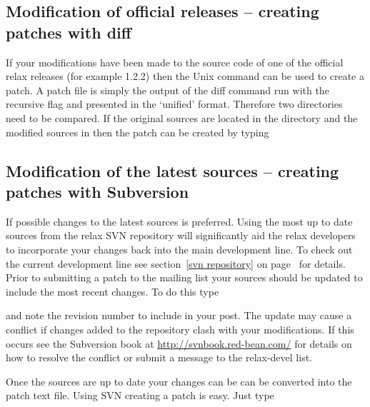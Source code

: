 \subsection{Modification of official releases -- creating patches with diff}

If your modifications have been made to the source code of one of the official relax releases (for example 1.2.2) then the Unix command  can be used to create a patch.  A patch file is simply the output of the diff command run with the recursive flag and presented in the `unified' format.  Therefore two directories need to be compared.  If the original sources are located in the directory  and the modified sources in  then the patch can be created by typing




\subsection{Modification of the latest sources -- creating patches with Subversion}

If possible changes to the latest sources is preferred.  Using the most up to date sources from the relax SVN repository will significantly aid the relax developers to incorporate your changes back into the main development line.  To check out the current development line see section~\ref{svn repository} on page~\pageref{svn repository} for details.  Prior to submitting a patch to the mailing list your sources should be updated to include the most recent changes.  To do this type


and note the revision number to include in your post.  The update may cause a conflict if changes added to the repository clash with your modifications.  If this occurs see the Subversion book at \href{http://svnbook.red-bean.com/}{http://svnbook.red-bean.com/} for details on how to resolve the conflict or submit a message to the rela\mbox{x-d}evel list.

Once the sources are up to date your changes can be can be converted into the patch text file.  Using SVN creating a patch is easy.  Just type

